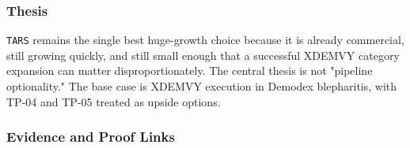 \documentclass[
  9pt,
]{article}
\begin{document}
\hypertarget{thesis}{%
\subsubsection{Thesis}\label{thesis}}

\texttt{TARS} remains the single best huge-growth choice because it is
already commercial, still growing quickly, and still small enough that a
successful XDEMVY category expansion can matter disproportionately. The
central thesis is not "pipeline optionality." The base case is XDEMVY
execution in Demodex blepharitis, with TP-04 and TP-05 treated as upside
options.

\hypertarget{evidence-and-proof-links}{%
\subsubsection{Evidence and Proof
Links}\label{evidence-and-proof-links}}
\end{document}
